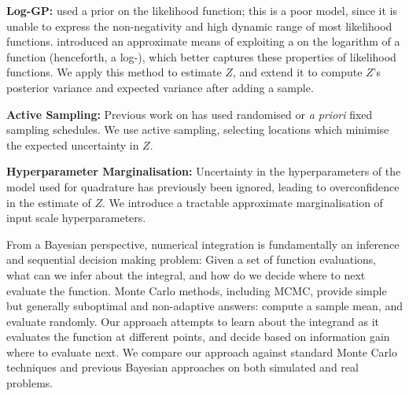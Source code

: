 \documentclass{article} %
\begin{document}
{\bf Log-GP:} \cite{BZMonteCarlo} used a \gpb prior on the likelihood function; this is a poor model, since it is unable to express the non-negativity and high dynamic range of most likelihood functions. \cite{BQR} introduced an approximate means of exploiting a \gpb on the logarithm of a function (henceforth, a log-\gp), which better captures these properties of likelihood functions. We apply this method to estimate $Z$, and extend it to compute $Z$'s posterior variance and expected variance after adding a sample. 

{\bf Active Sampling:} Previous work on  has used randomised or {\it a priori} fixed sampling schedules. We use active sampling, selecting locations which minimise  the expected uncertainty in $Z$.


{\bf Hyperparameter Marginalisation:} Uncertainty in the hyperparameters of the model used for quadrature has previously been ignored, leading to overconfidence in the estimate of $Z$.  We introduce a tractable approximate marginalisation of input scale hyperparameters.


From a Bayesian perspective, numerical integration is fundamentally an inference and sequential decision making problem: Given a set of function evaluations, what can we infer about the integral, and how do we decide where to next evaluate the function. Monte Carlo methods, including MCMC, provide simple but generally suboptimal and non-adaptive answers: compute a sample mean, and evaluate randomly. Our approach attempts to learn about the integrand as it evaluates the function at different points, and decide based on information gain where to evaluate next. We compare our approach against standard Monte Carlo techniques and previous Bayesian approaches on both simulated and real problems.
\end{document}
